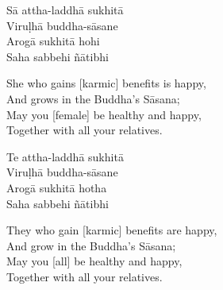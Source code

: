 \begin{pali-hang}
  Sā attha-laddhā sukhitā\\
  Viruḷhā buddha-sāsane\\
  Arogā sukhitā hohi\\
  Saha sabbehi ñātibhi
\end{pali-hang}

\begin{english-verses}
  She who gains [karmic] benefits is happy,\\
  And grows in the Buddha's Sāsana;\\
  May you [female] be healthy and happy,\\
  Together with all your relatives.
\end{english-verses}

\ifninebythirteen\clearpage\fi

\begin{pali-hang}
  Te attha-laddhā sukhitā\\
  Viruḷhā buddha-sāsane\\
  Arogā sukhitā hotha\\
  Saha sabbehi ñātibhi
\end{pali-hang}

\ifafive\clearpage\fi

\begin{english-verses}
  They who gain [karmic] benefits are happy,\\
  And grow in the Buddha's Sāsana;\\
\ifbfive\enlargethispage{1.2\baselineskip}\fi
  May you [all] be healthy and happy,\\
  Together with all your relatives.
\end{english-verses}

\suttaRef{[AN 3.155]}

\ifdigital{}\fi

